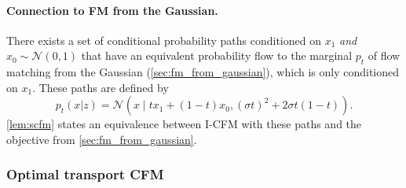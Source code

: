 \documentclass[10pt]{article}
\theoremstyle{plain}
\theoremstyle{definition}
\theoremstyle{remark}
\begin{document}
\paragraph{Connection to FM from the Gaussian.} 

There exists a set of conditional probability paths conditioned on $x_1$ \textit{and} $x_0 \sim \mathcal{N}(0, 1)$ that have an equivalent probability flow to the marginal $p_t$ of flow matching from the Gaussian (\autoref{sec:fm_from_gaussian}), which is only conditioned on $x_1$. These paths are defined by
\begin{equation}
p_t(x | z) = \mathcal{N}(x\mid t x_1 + (1 - t) x_0, (\sigma t)^2 + 2 \sigma t (1-t)).\label{eq:scfm:pt} 
\end{equation}
\autoref{lem:scfm} states an equivalence between I-CFM with these paths and the objective from \autoref{sec:fm_from_gaussian}. 

\subsubsection{Optimal transport CFM}\label{sec:ot_conditional_fm}
\end{document}
